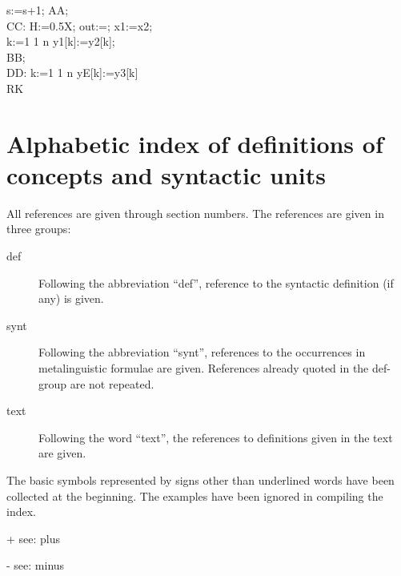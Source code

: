 \documentclass[a4paper,11pt]{article}
\begin{document}
\begin{flushleft}
{\hspace{1.0cm}s:=s+1;  AA;\\
\vspace{1.0em}
CC: H:=0.5\mtim{}X; out:=; x1:=x2;\\
\hspace{1.0cm} k:=1  1  n  y1[k]:=y2[k];\\
\hspace{1.0cm} BB;\\
\vspace{1.0em}
DD:  k:=1  1  n  yE[k]:=y3[k]\\
 RK\\
}\end{flushleft}








\section{Alphabetic index of definitions of concepts and syntactic units}

All references are given through section numbers.  The references are
given in three groups:

\begin{description}

\item[def] Following the abbreviation ``def'', reference to the
             syntactic definition (if any) is given.

\item[synt] Following the abbreviation ``synt'', references to the
             occurrences in metalinguistic formulae are given.
             References already quoted in the def-group are not
             repeated.

\item[text] Following the word ``text'', the references to definitions
             given in the text are given. 

\end{description}

The basic symbols represented by signs other than underlined words
have been collected at the beginning.  The examples have been ignored
in compiling the index.


+ see: plus

- see: minus
\end{document}

